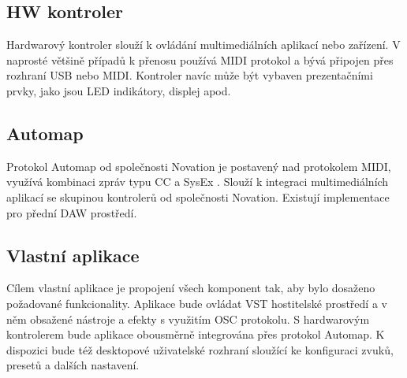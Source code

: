 \documentclass[thesis=M,czech]{FITthesis}[2019/03/06]
\begin{document}
	\subsection{HW kontroler}
	Hardwarový kontroler slouží k ovládání multimediálních aplikací nebo zařízení. V naprosté většině případů k přenosu používá MIDI protokol
	a bývá připojen přes rozhraní USB nebo MIDI. Kontroler navíc může být vybaven prezentačními prvky, jako jsou LED indikátory, displej apod.
	
	\subsection{Automap}
	Protokol Automap od společnosti Novation je postavený nad protokolem MIDI, využívá kombinaci zpráv typu CC a SysEx \cite{midi}\cite{automap}.
	Slouží k integraci multimediálních aplikací se skupinou kontrolerů od společnosti Novation. Existují implementace pro 
	přední DAW prostředí.
	
	\subsection{Vlastní aplikace}
	Cílem vlastní aplikace je propojení všech komponent tak, aby bylo dosaženo požadované funkcionality.
	Aplikace bude ovládat VST hostitelské prostředí a v něm obsažené nástroje a efekty s využitím OSC protokolu.
	S hardwarovým kontrolerem bude aplikace obousměrně integrována přes protokol Automap.
	K dispozici bude též desktopové uživatelské rozhraní sloužící ke konfiguraci zvuků, presetů a dalších nastavení.
	\clearpage
\end{document}
